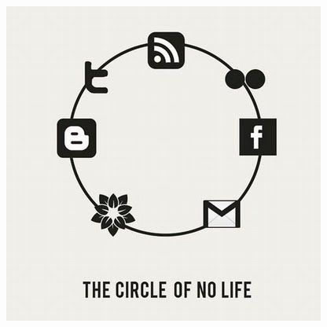 \documentclass[18pt]{beamer}
\begin{document}
\begin{frame}[full]
\includegraphics[scale=0.55]{bilder/comics/September-25-2011-18-44-59-aa71ce1bd67502c27bc56a6b8d724897.jpeg}
\end{frame}
\end{document}
